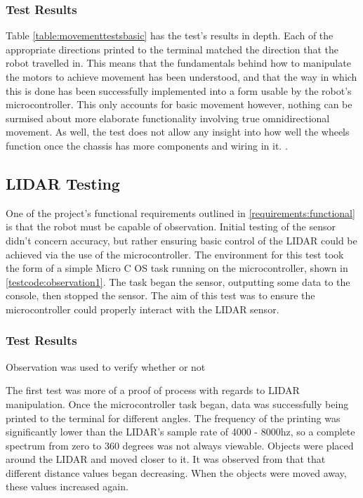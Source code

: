 				\subsubsection{Test Results}
				Table \ref{table:movementtestsbasic} has the test's results in depth. Each of the appropriate directions printed to the terminal matched the direction that the robot travelled in. This means that the fundamentals behind how to manipulate the motors to achieve movement has been understood, and that the way in which this is done has been successfully implemented into a form usable by the robot's microcontroller. This only accounts for basic movement however, nothing can be surmised about more elaborate functionality involving true omnidirectional movement. As well, the test does not allow any insight into how well the wheels function once the chassis has more components and wiring in it. .
			
			\subsection{LIDAR Testing}
			One of the project's functional requirements outlined in \ref{requirements:functional} is that the robot must be capable of observation. Initial testing of the sensor didn't concern accuracy, but rather ensuring basic control of the LIDAR could be achieved via the use of the microcontroller. The environment for this test took the form of a simple Micro C OS task running on the microcontroller, shown in \ref{testcode:observation1}. The task began the sensor, outputting some data to the console, then stopped the sensor. The aim of this test was to ensure the microcontroller could properly interact with the LIDAR sensor.
			
				\subsubsection{Test Results}
				Observation was used to verify whether or not 
				
				The first test was more of a proof of process with regards to LIDAR manipulation. Once the microcontroller task began, data was successfully being printed to the terminal for different angles. The frequency of the printing was significantly lower than the LIDAR's sample rate of 4000 - 8000hz, so a complete spectrum from zero to 360 degrees was not always viewable. Objects were placed around the LIDAR and moved closer to it. It was observed from that that different distance values began decreasing. When the objects were moved away, these values increased again. 
				
